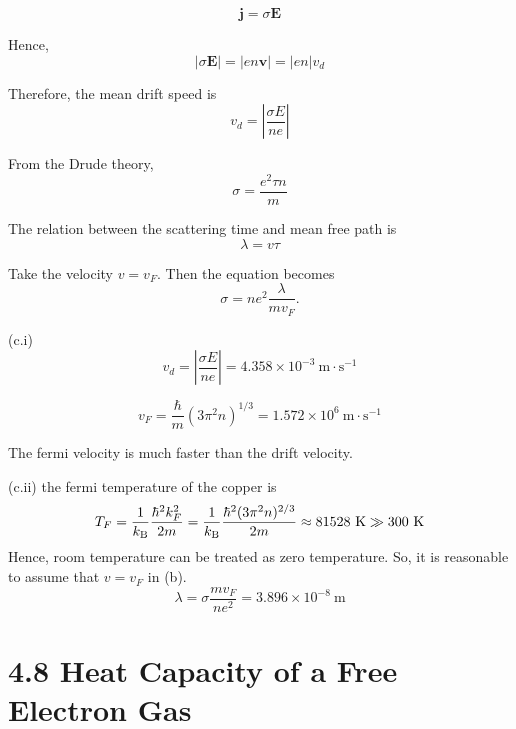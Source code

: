 \documentclass[a4paper,11pt]{article}
\begin{document}
\begin{equation}
    \mathbf j=\sigma\mathbf E
\end{equation}

Hence, 
\begin{equation}
    |\sigma\mathbf E|=|en\mathbf v|=|en|v_d
\end{equation}

Therefore, the mean drift speed is
\begin{equation}
    v_d=\left|\frac{\sigma E}{ne}\right|
\end{equation}

From the Drude theory,
\begin{equation}
    \sigma = \frac{e^2\tau n}{m}
\end{equation}

The relation between the scattering time and mean free path is
\begin{equation}
    \lambda=v\tau
\end{equation}

Take the velocity $v=v_F$. Then the equation becomes
\begin{equation}
    \sigma = ne^2\frac{\lambda}{mv_F}.
\end{equation}

(c.i) 
\begin{equation}
    v_d=\left|\frac{\sigma E}{ne}\right| = 4.358 \times 10^{-3}\ \mathrm{m} \cdot \mathrm{s}^{-1}
\end{equation}

\begin{equation}
    v_F = \frac{\hbar}{m}(3\pi^2 n)^{1/3} = 1.572 \times 10^{6}\ \mathrm{m} \cdot \mathrm{s}^{-1}
\end{equation}

The fermi velocity is much faster than the drift velocity.

(c.ii)
the fermi temperature of the copper is
\begin{equation}
    T_F=\frac{1}{k_{\mathrm{B}}}\frac{\hbar^2k_F^2}{2m}=\frac{1}{k_{\mathrm{B}}}\frac{\hbar^2(3\pi^2n)^{2/3}}{2m} \approx 81528\ \mathrm{K} \gg 300\ \mathrm{K}
\end{equation}
Hence, room temperature can be treated as zero temperature. So, it is reasonable to assume that $v=v_F$ in (b).
\begin{equation}
    \lambda = \sigma\frac{mv_F}{ne^2} = 3.896\times10^{-8}\ \mathrm{m}
\end{equation}



\section{4.8 Heat Capacity of a Free Electron Gas}
\end{document}

